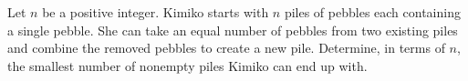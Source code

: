 Let $n$ be a positive integer.
Kimiko starts with $n$ piles of pebbles each containing a single pebble.
She can take an equal number of pebbles from two existing piles and
combine the removed pebbles to create a new pile.
Determine, in terms of $n$, the smallest number of nonempty piles Kimiko can end up with.
